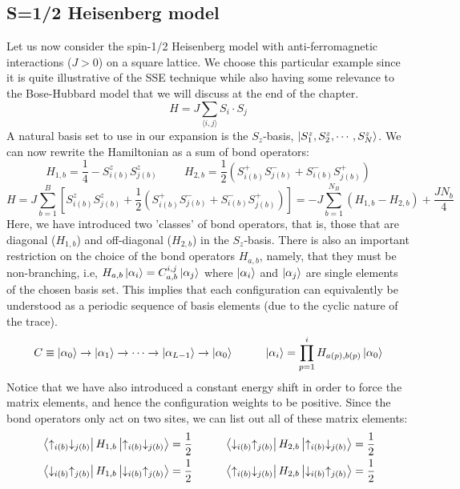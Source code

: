 \subsection{S=1/2 Heisenberg model}
Let us now consider the spin-1/2 Heisenberg model with anti-ferromagnetic interactions ($J > 0$) on a square lattice. We choose this particular example since it is quite illustrative of the SSE technique while also having some relevance to the Bose-Hubbard model that we will discuss at the end of the chapter.  
\begin{equation}
    H = J\sum_{\langle i, j \rangle} S_i \cdot S_j
\end{equation}
A natural basis set to use in our expansion is the $S_z$-basis, $\ket{S_1^z, S_2^z, \cdots, S_N^z}$. We can now rewrite the Hamiltonian as a sum of bond operators:
\begin{equation}
    H_{1, b} = \frac{1}{4} - S_{i(b)}^z S_{j(b)}^z \hspace{1cm} H_{2, b} = \frac{1}{2}(S_{i(b)}^+ S_{j(b)}^- + S_{i(b)}^- S_{j(b)}^+)    
\end{equation}
\begin{equation}
    H = J\sum_{b = 1}^B [S_{i(b)}^z S_{j(b)}^z + \frac{1}{2}(S_{i(b)}^+ S_{j(b)}^- + S_{i(b)}^- S_{j(b)}^+)] = -J\sum_{b=1}^{N_B}(H_{1, b} - H_{2, b}) + \frac{JN_b}{4}
\end{equation}
Here, we have introduced two 'classes' of bond operators, that is, those that are diagonal ($H_{1, b}$) and off-diagonal ($H_{2, b}$) in the $S_z$-basis.
There is also an important restriction on the choice of the bond operators $H_{a,b}$, namely, that they must be non-branching, i.e, $H_{a,b}\ket{\alpha_i} = C_{a,b}^{i, j} \ket{\alpha_j}$ where $\ket{\alpha_i}$ and  $\ket{\alpha_j}$ are single elements of the chosen basis set. This implies that each configuration can equivalently be understood as a periodic sequence of basis elements (due to the cyclic nature of the trace).
\begin{equation}
    C \equiv \ket{\alpha_0} \rightarrow \ket{\alpha_1} \rightarrow \dots \rightarrow \ket{\alpha_{L-1}} \rightarrow \ket{\alpha_0} \hspace{1cm} \ket{\alpha_i} = \prod_{p=1}^iH_{a(p), b(p)}\ket{\alpha_0}
\end{equation}
Notice that we have also introduced a constant energy shift in order to force the matrix elements, and hence the configuration weights to be positive. Since the bond operators only act on two sites, we can list out all of these matrix elements:
\begin{align*}
    &\bra{\uparrow_{i(b)} \downarrow_{j(b)}}H_{1, b}\ket{\uparrow_{i(b)} \downarrow_{j(b)}} = \frac{1}{2}\hspace{1cm} \bra{\downarrow_{i(b)} \uparrow_{j(b)}}H_{2, b}\ket{\uparrow_{i(b)} \downarrow_{j(b)}} = \frac{1}{2} \\ 
    &\bra{\downarrow_{i(b)} \uparrow_{j(b)}}H_{1, b}\ket{\downarrow_{i(b)} \uparrow_{j(b)}} = \frac{1}{2} \hspace{1cm}     \bra{\uparrow_{i(b)} \downarrow_{j(b)}}H_{2, b}\ket{\downarrow_{i(b)} \uparrow_{j(b)}} = \frac{1}{2} 
\end{align*}

